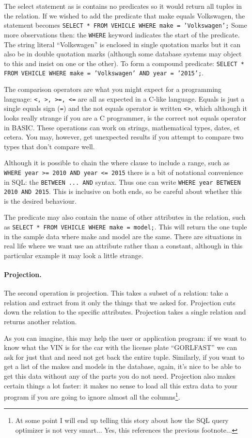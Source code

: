 The select statement as is contains no predicates so it would return all tuples in the relation. If we wished to add the predicate that make equals Volkswagen, the statement becomes \texttt{SELECT * FROM VEHICLE WHERE make = 'Volkswagen';} Some more observations then: the \texttt{WHERE} keyword indicates the start of the predicate. The string literal ``Volkswagen'' is enclosed in single quotation marks but it can also be in double quotation marks (although some database systems may object to this and insist on one or the other). To form a compound predicate: \texttt{SELECT * FROM VEHICLE WHERE make = 'Volkswagen' AND year = '2015';}. 

The comparison operators are what you might expect for a programming language: \texttt{<, >, >=, <=} are all as expected in a C-like language. Equals is just a single equals sign (\texttt{=}) and the not equals operator is written \texttt{<>}, which although it looks really strange if you are a C programmer, is the correct not equals operator in BASIC. These operations can work on strings, mathematical types, dates, et cetera. You may, however, get unexpected results if you attempt to compare two types that don't compare well.

Although it is possible to chain the where clause to include a range, such as \texttt{WHERE year >= 2010 AND year <= 2015} there is a bit of notational convenience in SQL: the \texttt{BETWEEN ... AND} syntax. Thus one can write \texttt{WHERE year BETWEEN 2010 AND 2015}. This is inclusive on both ends, so be careful about whether this is the desired behaviour. 

The predicate may also contain the name of other attributes in the relation, such as \texttt{SELECT * FROM VEHICLE WHERE make = model;}. This will return the one tuple in the sample data where make and model are the same. There are situations in real life where we want use an attribute rather than a constant, although in this particular example it may look a little strange.

\paragraph{Projection.} The second operation is projection. This takes a subset of a relation: take a relation and extract from it only the things that we asked for. Projection cuts down the relation to the specific attributes. Projection takes a single relation and returns another relation.

As you can imagine, this may help the user or application program: if we want to know what the VIN is for the car with the license plate ``GORLFAST'' we can ask for just that and need not get back the entire tuple. Similarly, if you want to get a list of the makes and models in the database, again, it's nice to be able to get this data without any of the parts you do not need. Projection also makes certain things a lot faster: it makes no sense to load all this extra data to your program if you are going to ignore almost all the columns\footnote{At some point I will end up telling this story about how the SQL query optimizer is not very smart... Yes, this references the previous footnote...}.

